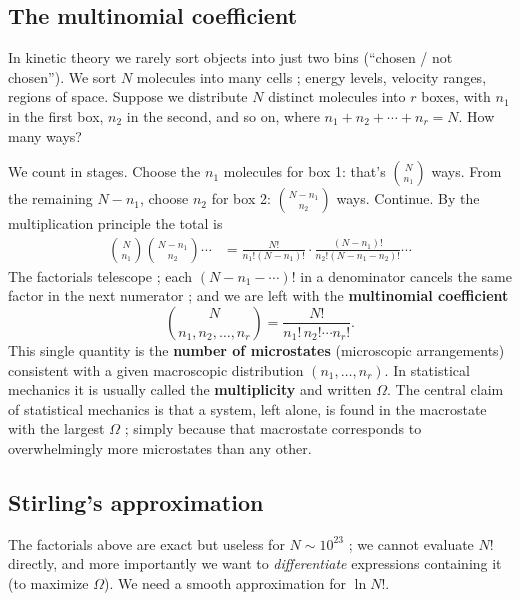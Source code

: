 \documentclass{report}
\numberwithin{equation}{section}
\begin{document}
\subsection{The multinomial coefficient}
In kinetic theory we rarely sort objects into just two bins (``chosen / not chosen''). We sort $N$ molecules into many cells ; energy levels, velocity ranges, regions of space. Suppose we distribute $N$ distinct molecules into $r$ boxes, with $n_1$ in the first box, $n_2$ in the second, and so on, where $n_1+n_2+\cdots+n_r = N$. How many ways?

We count in stages. Choose the $n_1$ molecules for box 1: that's $\binom{N}{n_1}$ ways. From the remaining $N-n_1$, choose $n_2$ for box 2: $\binom{N-n_1}{n_2}$ ways. Continue. By the multiplication principle the total is
\begin{align*}
	\binom{N}{n_1}\binom{N-n_1}{n_2}\cdots
	&= \frac{N!}{n_1!(N-n_1)!}\cdot\frac{(N-n_1)!}{n_2!(N-n_1-n_2)!}\cdots
\end{align*}
The factorials telescope ; each $(N-n_1-\cdots)!$ in a denominator cancels the same factor in the next numerator ; and we are left with the \textbf{multinomial coefficient}
\begin{equation}
	\binom{N}{n_1,n_2,\ldots,n_r} = \frac{N!}{n_1!\,n_2!\cdots n_r!}.
\end{equation}
This single quantity is the \textbf{number of microstates} (microscopic arrangements) consistent with a given macroscopic distribution $(n_1,\ldots,n_r)$. In statistical mechanics it is usually called the \textbf{multiplicity} and written $\Omega$. The central claim of statistical mechanics is that a system, left alone, is found in the macrostate with the largest $\Omega$ ; simply because that macrostate corresponds to overwhelmingly more microstates than any other.

\subsection{Stirling's approximation}
The factorials above are exact but useless for $N\sim 10^{23}$ ; we cannot evaluate $N!$ directly, and more importantly we want to \emph{differentiate} expressions containing it (to maximize $\Omega$). We need a smooth approximation for $\ln N!$.
\end{document}
